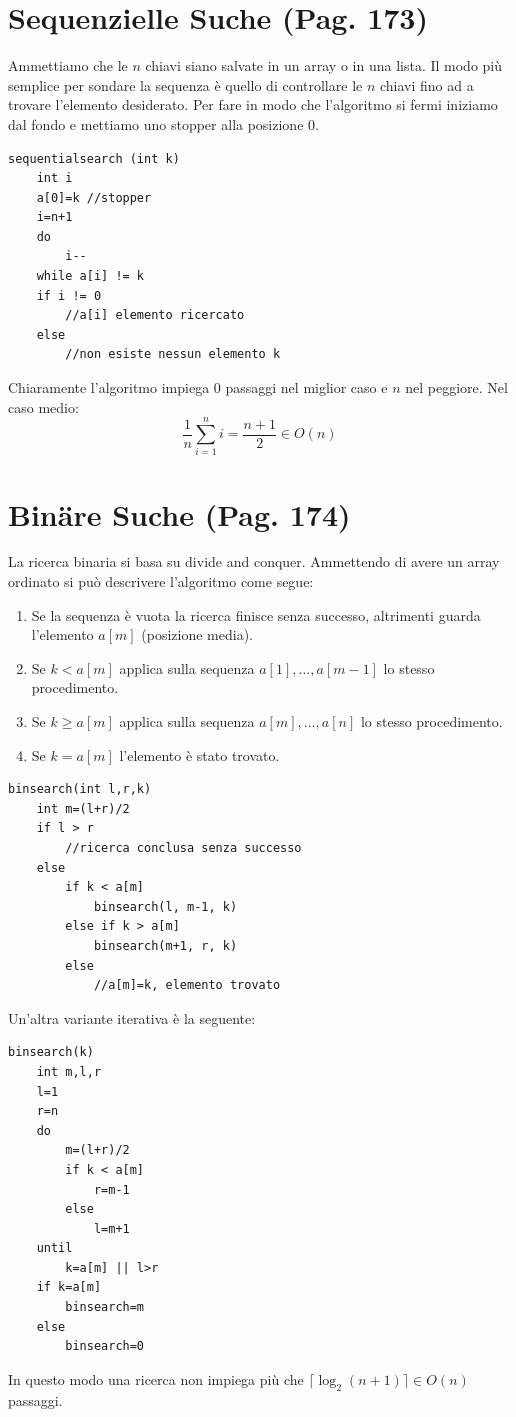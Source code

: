 \documentclass[a4paper]{book}
\newcommand{\lstIndent}{4}
\begin{document}
\section{Sequenzielle Suche (Pag. 173)}
Ammettiamo che le $n$ chiavi siano salvate in un array o in una lista. Il modo più semplice per sondare la sequenza è quello di controllare le $n$ chiavi fino ad a trovare l'elemento desiderato. Per fare in modo che l'algoritmo si fermi iniziamo dal fondo e mettiamo uno stopper alla posizione 0.
\begin{lstlisting}[tabsize=\lstIndent]
sequentialsearch (int k)
	int i
	a[0]=k //stopper
	i=n+1
	do
		i--
	while a[i] != k
	if i != 0
		//a[i] elemento ricercato
	else
		//non esiste nessun elemento k		
\end{lstlisting} 
Chiaramente l'algoritmo impiega 0 passaggi nel miglior caso e $n$ nel peggiore. Nel caso medio:
$$ \frac{1}{n} \sum_{i=1}^n i = \frac{n+1}{2} \in O(n) $$
\section{Binäre Suche (Pag. 174)}
La ricerca binaria si basa su divide and conquer. Ammettendo di avere un array ordinato si può descrivere l'algoritmo come segue:
\begin{enumerate}
\item Se la sequenza è vuota la ricerca finisce senza successo, altrimenti guarda l'elemento $a[m]$ (posizione media).
\item Se $k < a[m]$ applica sulla sequenza $a[1],\dots, a[m-1]$ lo stesso procedimento.
\item Se $k \geq a[m]$ applica sulla sequenza $a[m],\dots, a[n]$ lo stesso procedimento.
\item Se $k = a[m]$ l'elemento è stato trovato.
\end{enumerate}
\begin{lstlisting}[tabsize=\lstIndent]
binsearch(int l,r,k)
	int m=(l+r)/2
	if l > r
		//ricerca conclusa senza successo
	else
		if k < a[m]
			binsearch(l, m-1, k)
		else if k > a[m]
			binsearch(m+1, r, k)	
		else
			//a[m]=k, elemento trovato				
\end{lstlisting}
Un'altra variante iterativa è la seguente:
\begin{lstlisting}[tabsize=\lstIndent]
binsearch(k)
	int m,l,r
	l=1
	r=n
	do
		m=(l+r)/2
		if k < a[m]
			r=m-1
		else
			l=m+1
	until
		k=a[m] || l>r
	if k=a[m]
		binsearch=m
	else
		binsearch=0								
\end{lstlisting}
In questo modo una ricerca non impiega più che $\lceil \log_2(n+1) \rceil \in O(n) $ passaggi.
\end{document}

